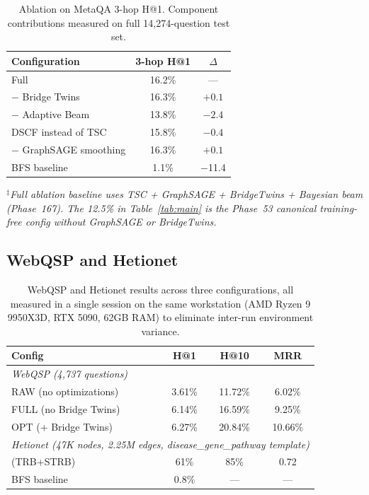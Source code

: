 \documentclass[10pt,twocolumn]{article}
\begin{document}
\begin{table}[h]
\small
\centering
\caption{Ablation on MetaQA 3-hop H@1. Component contributions measured on full 14,274-question test set.}
\label{tab:ablation}
\begin{tabular}{lcc}
\toprule
\textbf{Configuration} & \textbf{3-hop H@1} & \textbf{$\Delta$} \\
\midrule
Full \CEREBRUM{}        & 16.2\%   & --- \\
$-$ Bridge Twins                         &       16.3\% &     $+0.1$ \\
$-$ Adaptive Beam                        &       13.8\% &     $-2.4$ \\
DSCF instead of TSC                      &       15.8\% &     $-0.4$ \\
$-$ GraphSAGE smoothing                  &       16.3\% &     $+0.1$ \\
BFS baseline            &  1.1\%   & $-$11.4 \\
\bottomrule
\end{tabular}
\end{table}

\noindent\emph{$^\ddagger$Full \CEREBRUM{} ablation baseline uses TSC + GraphSAGE + BridgeTwins + Bayesian beam (Phase~167). The 12.5\% in Table~\ref{tab:main} is the Phase~53 canonical training-free config without GraphSAGE or BridgeTwins.}

\subsection{WebQSP and Hetionet}

\begin{table}[h]
\small
\centering
\caption{WebQSP and Hetionet results across three \CEREBRUM{} configurations,
all measured in a single session on the same workstation (AMD Ryzen 9 9950X3D,
RTX 5090, 62GB RAM) to eliminate inter-run environment variance.}
\label{tab:webqsp}
\begin{tabular}{lccc}
\toprule
\textbf{Config} & \textbf{H@1} & \textbf{H@10} & \textbf{MRR} \\
\midrule
\multicolumn{4}{l}{\textit{WebQSP (4,737 questions)}} \\
RAW (no optimizations)     & 3.61\% & 11.72\% &  6.02\% \\
FULL (no Bridge Twins)     & 6.14\% & 16.59\% &  9.25\% \\
OPT (+ Bridge Twins)       & 6.27\% & 20.84\% & 10.66\% \\
\midrule
\multicolumn{4}{l}{\textit{Hetionet (47K nodes, 2.25M edges, disease\_gene\_pathway template)}} \\
\CEREBRUM{} (TRB+STRB)     & 61\%   & 85\%    & 0.72    \\
BFS baseline               &  0.8\% &  —      & —       \\
\bottomrule
\end{tabular}
\end{table}
\end{document}

